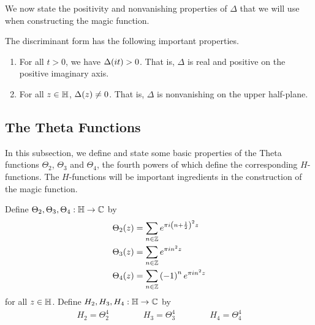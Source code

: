 
We now state the positivity and nonvanishing properties of $\Delta$ that we will use when constructing the magic function.

\begin{boxcorollary}
    The discriminant form has the following important properties.
    \begin{enumerate}
        \item For all $t > 0$, we have $\Delta\!\left( it \right) > 0$. That is, $\Delta$ is real and positive on the positive imaginary axis.
        \item For all $z \in \mathbb{H}$, $\Delta\!\left( z \right) \neq 0$. That is, $\Delta$ is nonvanishing on the upper half-plane.
    \end{enumerate}
\end{boxcorollary}

\subsection{The Theta Functions}
\label{Ch2:Subsec:ThetaFunctions}

In this subsection, we define and state some basic properties of the Theta functions $\Theta_2$, $\Theta_3$ and $\Theta_4$, the fourth powers of which define the corresponding $H$-functions. The $H$-functions will be important ingredients in the construction of the magic function.

\begin{boxdefinition}\label{Ch2:Def:Theta_H}
    Define $\Theta_2, \Theta_3, \Theta_4 : \mathbb{H} \to \mathbb{C}$ by
    \begin{align*}
        \Theta_2(z) &= \sum_{n \in \mathbb{Z}} e^{\pi i \left( n + \frac{1}{2} \right)^2 z} \\
        \Theta_3(z) &= \sum_{n \in \mathbb{Z}} e^{\pi i n^2 z} \\
        \Theta_4(z) &= \sum_{n \in \mathbb{Z}} \left( -1 \right)^n e^{\pi i n^2 z}
    \end{align*}
    for all $z \in \mathbb{H}$. Define $H_2, H_3, H_4 : \mathbb{H} \to \mathbb{C}$ by
    \begin{align*}
        H_2 = \Theta_2^4 \qquad\qquad
        H_3 = \Theta_3^4 \qquad\qquad
        H_4 = \Theta_4^4
    \end{align*}
\end{boxdefinition}

